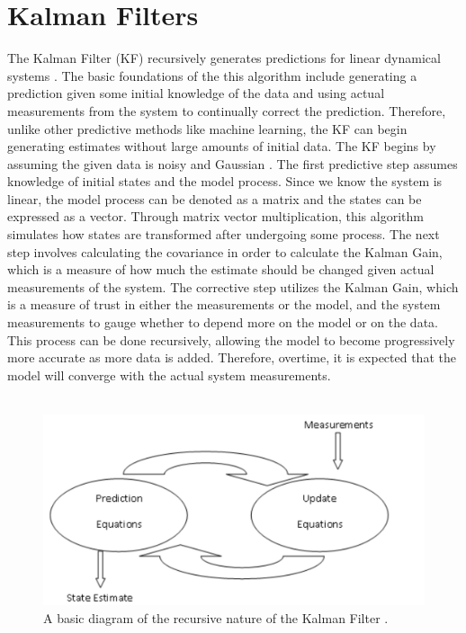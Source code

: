 \chapter{Kalman Filters}
\label{Kalman Filters}



The Kalman Filter (KF) recursively generates predictions for linear dynamical systems \cite{inbook}. The basic foundations of the this algorithm include generating a prediction given some initial knowledge of the data and using actual measurements from the system to continually correct the prediction. Therefore,  unlike other predictive methods like machine learning, the KF can begin generating estimates without large amounts of initial data. The KF begins by assuming the given data is noisy and Gaussian \cite{inproceedings, article7}. The first predictive step assumes knowledge of initial states and the model process. Since we know the system is linear, the model process can be denoted as a matrix and the states can be expressed as a vector. Through matrix vector  multiplication, this algorithm simulates how states are transformed after undergoing some process. The next step involves calculating the covariance in order to calculate the Kalman Gain, which is a measure of how much the estimate should be changed given actual measurements of the system. The corrective step utilizes the Kalman Gain, which is a measure of trust in either the measurements or the model, and the system measurements to gauge whether to depend more on the model or on the data. This process can be done recursively, allowing the model to become progressively more accurate as more data is added. Therefore, overtime, it is expected that the model will converge with the actual system measurements.
\\  \\

\begin{figure}[h]
    \centering
    \includegraphics[scale = 0.3]{diagram.png}
    \caption{A basic diagram of the recursive nature of the Kalman Filter \cite{kohanbash_2014}.}
\end{figure}
\newpage


